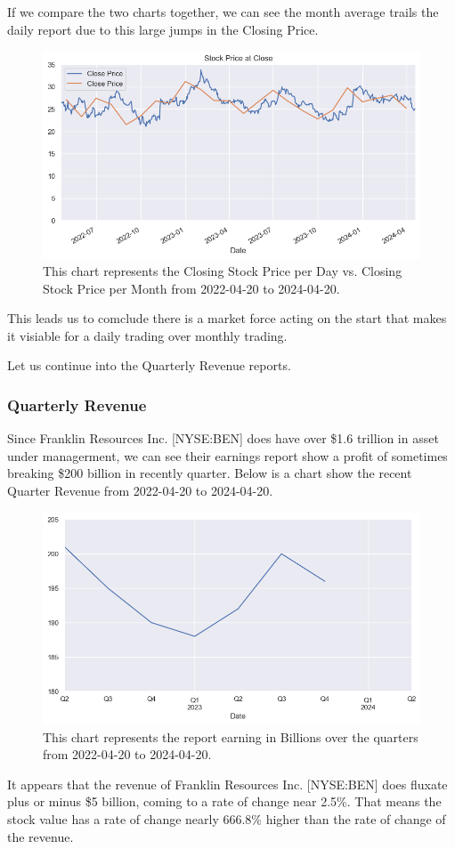 \documentclass[9pt,a4paper,twoside]{tau}
\begin{document}
        If we compare the two charts together, we can see the month average trails the daily report due to this large jumps in the Closing Price.
            \begin{figure}[H]
                \centering
                \includegraphics[width=0.85\columnwidth]{images/CloseDataSet1dvs1mo.png}
                \caption{This chart represents the Closing Stock Price per Day vs. Closing Stock Price per Month from 2022-04-20 to 2024-04-20.}
                \label{fig:figure}
            \end{figure}
        This leads us to comclude there is a market force acting on the start that makes it visiable for a daily trading over monthly trading. 

        Let us continue into the Quarterly Revenue reports.

    \subsubsection{Quarterly Revenue}
        Since Franklin Resources Inc. [NYSE:BEN] does have over \$1.6 trillion in asset under managerment, we can see their earnings report show a profit of sometimes breaking \$200 billion in recently quarter. Below is a chart show the recent Quarter Revenue from 2022-04-20 to 2024-04-20.
            \begin{figure}[H]
                \centering
                \includegraphics[width=0.85\columnwidth]{images/EarningByQt.png}
                \caption{This chart represents the report earning in Billions over the quarters from 2022-04-20 to 2024-04-20.}
                \label{fig:figure}
            \end{figure}
        It appears that the revenue of Franklin Resources Inc. [NYSE:BEN] does fluxate plus or minus \$5 billion, coming to a rate of change near 2.5\%.  That means the stock value has a rate of change nearly 666.8\% higher than the rate of change of the revenue. 
            
\end{document}
